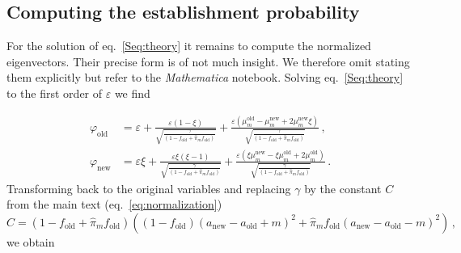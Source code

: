 \documentclass[11pt]{article}
\begin{document}

\subsection*{Computing the establishment probability}
For the solution of eq.~\eqref{Seq:theory} it remains to compute the normalized eigenvectors. Their precise form is of not much insight. We therefore omit stating them explicitly but refer to the \textit{Mathematica} notebook. Solving eq.~\eqref{Seq:theory} to the first order of $\varepsilon$ we find

\begin{equation}
\begin{aligned}
\varphi_{\text{old}} &= \varepsilon + \frac{\varepsilon\left(1-\xi\right)}{\sqrt{\frac{\gamma}{(1-f_{\text{old}}+\widehat{\pi}_m f_{\text{old}})}}}  + \frac{\varepsilon\left(\mu_m^{\text{old}} -\mu_m^{\text{new}} + 2 \mu_m^{\text{new}}\xi  \right)}{\sqrt{\frac{\gamma}{(1-f_{\text{old}}+\widehat{\pi}_m f_{\text{old}})}}}\, ,\\
\varphi_{\text{new}} &= \varepsilon\xi + \frac{\varepsilon\xi \left(\xi-1\right)}{\sqrt{\frac{\gamma}{(1-f_{\text{old}}+\widehat{\pi}_m f_{\text{old}})}}} + \frac{\varepsilon\left(\xi \mu_m^{\text{new}} -\xi \mu_m^{\text{old}} + 2 \mu_m^{\text{old}}  \right)}{\sqrt{\frac{\gamma}{(1-f_{\text{old}}+\widehat{\pi}_m f_{\text{old}})}}}\, .
\end{aligned}
\end{equation}
%
Transforming back to the original variables and replacing $\gamma$ by the constant $C$ from the main text (eq.~\eqref{eq:normalization})
\begin{equation}
C = (1-f_{\text{old}}+\widehat{\pi}_m f_{\text{old}}) \left((1-f_{\text{old}})(a_{\text{new}}-a_{\text{old}}+m)^2 + \widehat{\pi}_m f_{\text{old}} (a_{\text{new}}-a_{\text{old}}-m)^2\right)\, ,
\end{equation}
we obtain
\end{document}

